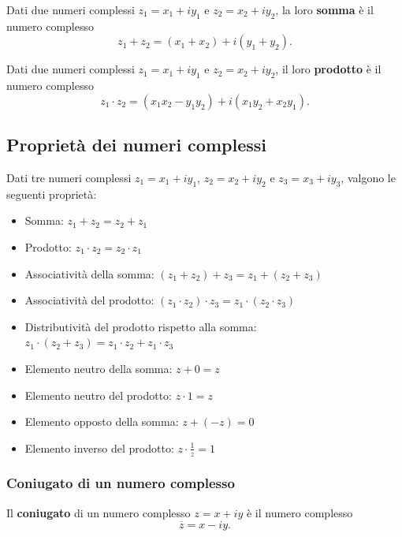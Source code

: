 \documentclass{book}
\begin{document}
\begin{theorem}
    Dati due numeri complessi \( z_1 = x_1 + i y_1 \) e \( z_2 = x_2 + i y_2 \), la loro \textbf{somma} è il numero complesso
    \[ z_1 + z_2 = (x_1 + x_2) + i (y_1 + y_2). \]
\end{theorem}
\begin{theorem}
    Dati due numeri complessi \( z_1 = x_1 + i y_1 \) e \( z_2 = x_2 + i y_2 \), il loro \textbf{prodotto} è il numero complesso
    \[ z_1 \cdot z_2 = (x_1 x_2 - y_1 y_2) + i (x_1 y_2 + x_2 y_1). \]
\end{theorem}
\subsection{Proprietà dei numeri complessi}
\begin{theorem}
    Dati tre numeri complessi \( z_1 = x_1 + i y_1 \), \( z_2 = x_2 + i y_2 \) e \( z_3 = x_3 + i y_3 \), valgono le seguenti proprietà:
    \begin{itemize}
        \item Somma: \( z_1 + z_2 = z_2 + z_1 \)
        \item Prodotto: \( z_1 \cdot z_2 = z_2 \cdot z_1 \)
        \item Associatività della somma: \( (z_1 + z_2) + z_3 = z_1 + (z_2 + z_3) \)
        \item Associatività del prodotto: \( (z_1 \cdot z_2) \cdot z_3 = z_1 \cdot (z_2 \cdot z_3) \)
        \item Distributività del prodotto rispetto alla somma: \( z_1 \cdot (z_2 + z_3) = z_1 \cdot z_2 + z_1 \cdot z_3 \)
        \item Elemento neutro della somma: \( z + 0 = z \)
        \item Elemento neutro del prodotto: \( z \cdot 1 = z \)
        \item Elemento opposto della somma: \( z + (-z) = 0 \)
        \item Elemento inverso del prodotto: \( z \cdot \frac{1}{z} = 1 \)
    \end{itemize}
\end{theorem}
\subsubsection{Coniugato di un numero complesso}
\begin{definition}
    Il \textbf{coniugato} di un numero complesso \( z = x + iy \) è il numero complesso
    \[ \overline{z} = x - iy. \]
\end{definition}
\end{document}
